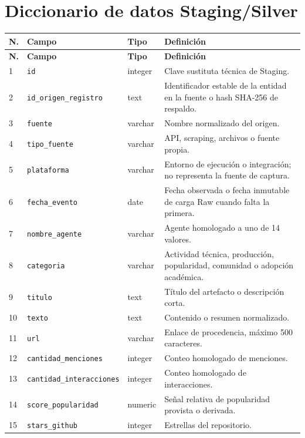 \documentclass[12pt,a4paper]{article}
\newcommand{\pathcode}[1]{\begingroup\small\ttfamily\nolinkurl{#1}\endgroup}
\begin{document}
\section{Diccionario de datos Staging/Silver}

\small
\begin{longtable}{P{0.9cm} P{4.1cm} P{2.8cm} P{6.0cm}}
\toprule
{}
\textbf{N.} & \textbf{Campo} & \textbf{Tipo} & \textbf{Definición} \\
\midrule
\endfirsthead
\toprule
{}
\textbf{N.} & \textbf{Campo} & \textbf{Tipo} & \textbf{Definición} \\
\midrule
{} & \pathcode{id} & integer & Clave sustituta técnica de Staging. \\
2 & \pathcode{id_origen_registro} & text & Identificador estable de la entidad en la fuente o hash SHA-256 de respaldo. \\
3 & \pathcode{fuente} & varchar & Nombre normalizado del origen. \\
4 & \pathcode{tipo_fuente} & varchar & API, scraping, archivos o fuente propia. \\
5 & \pathcode{plataforma} & varchar & Entorno de ejecución o integración; no representa la fuente de captura. \\
6 & \pathcode{fecha_evento} & date & Fecha observada o fecha inmutable de carga Raw cuando falta la primera. \\
7 & \pathcode{nombre_agente} & varchar & Agente homologado a uno de 14 valores. \\
8 & \pathcode{categoria} & varchar & Actividad técnica, producción, popularidad, comunidad o adopción académica. \\
9 & \pathcode{titulo} & text & Título del artefacto o descripción corta. \\
10 & \pathcode{texto} & text & Contenido o resumen normalizado. \\
11 & \pathcode{url} & varchar & Enlace de procedencia, máximo 500 caracteres. \\
12 & \pathcode{cantidad_menciones} & integer & Conteo homologado de menciones. \\
13 & \pathcode{cantidad_interacciones} & integer & Conteo homologado de interacciones. \\
14 & \pathcode{score_popularidad} & numeric & Señal relativa de popularidad provista o derivada. \\
15 & \pathcode{stars_github} & integer & Estrellas del repositorio. \\

\end{longtable}
\end{document}
